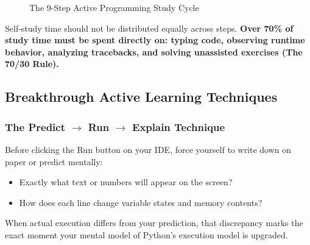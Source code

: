 \documentclass[11pt,a4paper]{article}
\begin{document}
\begin{figure}[htbp]
\centering
{}
\caption{The 9-Step Active Programming Study Cycle}
\end{figure}

Self-study time should not be distributed equally across steps. \textbf{Over 70\% of study time must be spent directly on: typing code, observing runtime behavior, analyzing tracebacks, and solving unassisted exercises (The 70/30 Rule).}

\subsection{Breakthrough Active Learning Techniques}

\subsubsection{The Predict \texorpdfstring{$\rightarrow$}{->} Run \texorpdfstring{$\rightarrow$}{->} Explain Technique}
Before clicking the Run button on your IDE, force yourself to write down on paper or predict mentally:
\begin{itemize}[leftmargin=1.5em, itemsep=2pt]
    \item Exactly what text or numbers will appear on the screen?
    \item How does each line change variable states and memory contents?
\end{itemize}
When actual execution differs from your prediction, that discrepancy marks the exact moment your mental model of Python's execution model is upgraded.
\end{document}
